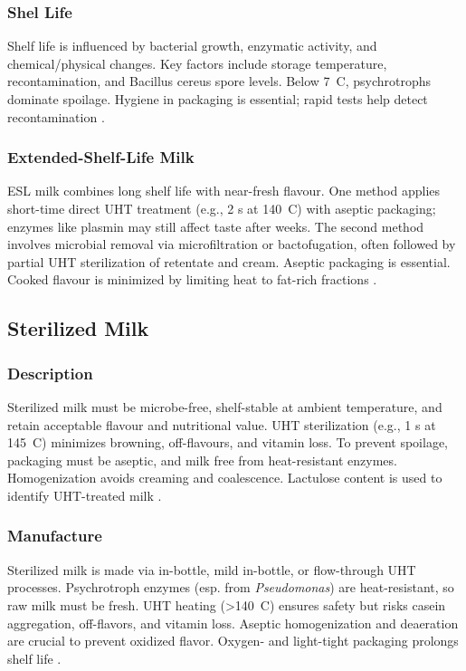 \subsubsection*{Shel Life}
Shelf life is influenced by bacterial growth, enzymatic activity, and chemical/physical changes. Key factors include storage temperature, recontamination, and Bacillus cereus spore levels. Below 7~\textdegree C, psychrotrophs dominate spoilage. Hygiene in packaging is essential; rapid tests help detect recontamination \cite*{curr_rm_01_dairy_science_technology}.

\subsubsection*{Extended-Shelf-Life Milk}
ESL milk combines long shelf life with near-fresh flavour. One method applies short-time direct UHT treatment (e.g., 2 s at 140~\textdegree C) with aseptic packaging; enzymes like plasmin may still affect taste after weeks. The second method involves microbial removal via microfiltration or bactofugation, often followed by partial UHT sterilization of retentate and cream. Aseptic packaging is essential. Cooked flavour is minimized by limiting heat to fat-rich fractions \cite*{curr_rm_01_dairy_science_technology}. 

\subsection{Sterilized Milk}
\subsubsection{Description}
Sterilized milk must be microbe-free, shelf-stable at ambient temperature, and retain acceptable flavour and nutritional value. UHT sterilization (e.g., 1 s at 145~\textdegree C) minimizes browning, off-flavours, and vitamin loss. To prevent spoilage, packaging must be aseptic, and milk free from heat-resistant enzymes. Homogenization avoids creaming and coalescence. Lactulose content is used to identify UHT-treated milk \cite*{curr_rm_01_dairy_science_technology}.

\subsubsection*{Manufacture}
Sterilized milk is made via in-bottle, mild in-bottle, or flow-through UHT processes. Psychrotroph enzymes (esp. from \textit{Pseudomonas}) are heat-resistant, so raw milk must be fresh. UHT heating (>140~\textdegree C) ensures safety but risks casein aggregation, off-flavors, and vitamin loss. Aseptic homogenization and deaeration are crucial to prevent oxidized flavor. Oxygen- and light-tight packaging prolongs shelf life \cite*{curr_rm_01_dairy_science_technology}. 

